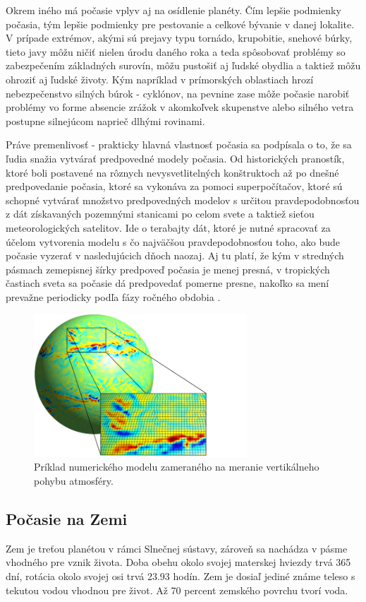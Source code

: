 Okrem iného má počasie vplyv aj na osídlenie planéty. Čím lepšie podmienky počasia, tým lepšie podmienky pre pestovanie a celkové bývanie v danej lokalite. V prípade extrémov, akými sú prejavy typu tornádo, krupobitie, snehové búrky, tieto javy môžu ničiť nielen úrodu daného roka a teda spôsobovať problémy so zabezpečením základných surovín, môžu pustošiť aj ľudské obydlia a taktiež môžu ohroziť aj ľudské životy. Kým napríklad v prímorských oblastiach hrozí nebezpečenstvo silných búrok - cyklónov, na pevnine zase môže počasie narobiť problémy vo forme absencie zrážok v akomkoľvek skupenstve alebo silného vetra postupne silnejúcom naprieč dlhými rovinami.

Práve premenlivosť - prakticky hlavná vlastnosť počasia sa podpísala o to, že sa ľudia snažia vytvárať predpovedné modely počasia. Od historických pranostík, ktoré boli postavené na rôznych nevysvetlitelných konštruktoch až po dnešné predpovedanie počasia, ktoré sa vykonáva za pomoci superpočítačov, ktoré sú schopné vytvárať množstvo predpovedných modelov s určitou pravdepodobnosťou z dát získavaných pozemnými stanicami po celom svete a taktiež sieťou meteorologických satelitov. Ide o terabajty dát, ktoré je nutné spracovať za účelom vytvorenia modelu s čo najväčšou pravdepodobnosťou toho, ako bude počasie vyzerať v nasledujúcich dňoch naozaj. Aj tu platí, že kým v stredných pásmach zemepisnej šírky predpoveď počasia je menej presná, v tropických častiach sveta sa počasie dá predpovedať pomerne presne, nakoľko sa mení prevažne periodicky podľa fázy ročného obdobia \cite{meteo}.

\begin{figure}[!htbp]
  \centering
  \includegraphics[width=8cm]{img/numerical_prediction_model.png}
  \caption{Príklad numerického modelu zameraného na meranie vertikálneho pohybu atmosféry.}
  \label{numModel}
\end{figure}

\subsection{Počasie na Zemi}
Zem je treťou planétou v rámci Slnečnej sústavy, zároveň sa nachádza v pásme vhodného pre vznik života. Doba obehu okolo svojej materskej hviezdy trvá 365 dní, rotácia okolo svojej osi trvá 23.93 hodín. Zem je dosiaľ jediné známe teleso s tekutou vodou vhodnou pre život. Až 70 percent zemského povrchu tvorí voda.

